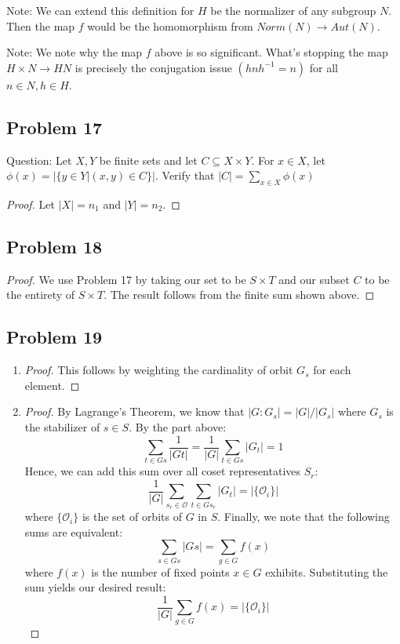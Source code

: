\documentclass[12pt]{article}
\begin{document}
Note: We can extend this definition for $H$ be the normalizer of any subgroup $N$. Then the map $f$ would be the homomorphism from $Norm(N) \rightarrow Aut(N)$. \par

Note: We note why the map $f$ above is so significant. What's stopping the map $H \times N \rightarrow HN$ is precisely the conjugation issue $(hnh^{-1} = n)$ for all $n \in N, h \in H$.

\subsection*{Problem 17}

Question: Let $X,Y$ be finite sets and let $C \subseteq X \times Y$. For $x \in X$, let $\phi(x) = | \{y \in Y \vert (x,y) \in C\}|$. Verify that $|C| = \sum_{x \in X} \phi(x)$

\begin{proof}
	Let $|X| = n_1$ and $|Y| = n_2$. 
\end{proof}

\subsection*{Problem 18}

\begin{proof}
	We use Problem 17 by taking our set to be $S \times T$ and our subset $C$ to be the entirety of $S \times T$. The result follows from the finite sum shown above.
\end{proof}

\subsection*{Problem 19}

\begin{enumerate}
	\item 
	\begin{proof}
		This follows by weighting the cardinality of orbit $G_s$ for each element. 	
	\end{proof}
	\item 
	\begin{proof}
	By Lagrange's Theorem, we know that $|G:G_s| = |G|/|G_s|$ where $G_s$ is the stabilizer of $s \in S$. By the part above: 
	$$\sum_{t \in Gs} \frac{1}{|Gt|} = \frac{1}{|G|}\sum_{t \in Gs} |G_t| = 1 $$
	Hence, we can add this sum over all coset representatives $S_r$:
	$$ \frac{1}{|G|} \sum_{s_r \in \mathcal{O}} \sum_{t \in Gs_r} |G_t| = |\{\mathcal{O}_i\}|$$
	where $\{\mathcal{O}_i\}$ is the set of orbits of $G$ in $S$. Finally, we note that the following sums are equivalent:
	$$\sum_{s \in Gs} |Gs| = \sum_{g \in G} f(x)$$ where $f(x)$ is the number of fixed points $x \in G$ exhibits. Substituting the sum yields our desired result:
	$$ \frac{1}{|G|} \sum_{g \in G} f(x) = |\{\mathcal{O}_i\}|$$	   
	\end{proof}	
\end{enumerate}
\end{document}
